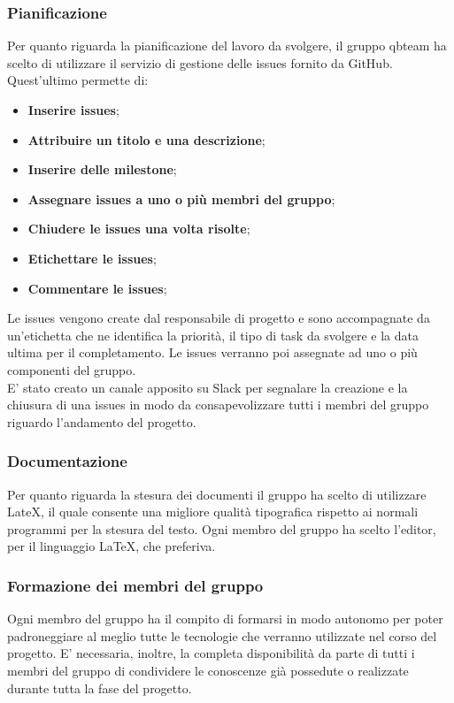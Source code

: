 \subsubsection{Pianificazione}
Per quanto riguarda la pianificazione del lavoro da svolgere, il gruppo qbteam ha scelto di utilizzare 
il servizio di gestione delle issues fornito da GitHub. Quest'ultimo permette di:
\begin{itemize}
\item \textbf{Inserire issues};
\item \textbf{Attribuire un titolo e una descrizione};
\item \textbf{Inserire delle milestone};
\item \textbf{Assegnare issues a uno o più membri del gruppo};
\item \textbf{Chiudere le issues una volta risolte};
\item \textbf{Etichettare le issues};
\item \textbf{Commentare le issues};
\end{itemize}
Le issues vengono create dal responsabile di progetto e sono accompagnate da un'etichetta che ne identifica la priorità, il tipo di task da svolgere e la data ultima per il completamento. Le issues verranno poi assegnate ad uno o più componenti del gruppo.\\
E' stato creato un canale apposito su Slack per segnalare la creazione e la chiusura di una issues in modo da consapevolizzare tutti i membri del gruppo riguardo l'andamento del progetto.
\subsubsection{Documentazione}
Per quanto riguarda la stesura dei documenti il gruppo ha scelto di utilizzare LateX, il quale consente una migliore qualità tipografica rispetto ai normali programmi per la stesura del testo.
Ogni membro del gruppo ha scelto l'editor, per il linguaggio LaTeX, che preferiva.
\subsubsection{Formazione dei membri del gruppo}
Ogni membro del gruppo ha il compito di formarsi in modo autonomo per poter padroneggiare al meglio tutte le tecnologie che verranno utilizzate nel corso del progetto.
E' necessaria, inoltre, la completa disponibilità da parte di tutti i membri del gruppo di condividere le conoscenze già possedute o realizzate durante tutta la fase del progetto.

